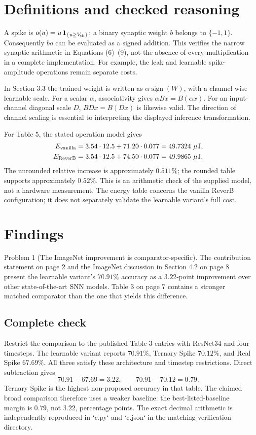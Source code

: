 \documentclass[10pt]{article}
\begin{document}
\section*{Definitions and checked reasoning}
A spike is \(o(u)=u\,\mathbf 1_{\{u\geq V_{\rm th}\}}\); a binary synaptic weight \(b\) belongs to \(\{-1,1\}\). Consequently \(bo\) can be evaluated as a signed addition. This verifies the narrow synaptic arithmetic in Equations (6)–(9), not the absence of every multiplication in a complete implementation. For example, the leak and learnable spike-amplitude operations remain separate costs.\par
In Section 3.3 the trained weight is written as \(\alpha\operatorname{sign}(W)\), with a channel-wise learnable scale. For a scalar \(\alpha\), associativity gives \(\alpha Bx=B(\alpha x)\). For an input-channel diagonal scale \(D\), \(BDx=B(Dx)\) is likewise valid. The direction of channel scaling is essential to interpreting the displayed inference transformation.\par
For Table 5, the stated operation model gives \[\begin{aligned}
 E_{\rm vanilla}
 &=3.54\cdot12.5+71.20\cdot0.077
   =49.7324\ \mu{\rm J},\\
 E_{\rm ReverB}
 &=3.54\cdot12.5+74.50\cdot0.077
   =49.9865\ \mu{\rm J}.\end{aligned}\] The unrounded relative increase is approximately \(0.511\%\); the rounded table supports approximately \(0.52\%\). This is an arithmetic check of the supplied model, not a hardware measurement. The energy table concerns the vanilla ReverB configuration; it does not separately validate the learnable variant’s full cost.\par
\section*{Findings}
Problem 1 (The ImageNet improvement is comparator-specific).  The contribution statement on page 2 and the ImageNet discussion in Section 4.2 on page 8 present the learnable variant’s \(70.91\%\) accuracy as a \(3.22\)-point improvement over other state-of-the-art SNN models. Table 3 on page 7 contains a stronger matched comparator than the one that yields this difference.\par
\subsection*{Complete check}
Restrict the comparison to the published Table 3 entries with ResNet34 and four timesteps. The learnable variant reports \(70.91\%\), Ternary Spike \(70.12\%\), and Real Spike \(67.69\%\). All three satisfy these architecture and timestep restrictions. Direct subtraction gives \[70.91-67.69=3.22,\qquad 70.91-70.12=0.79.\] Ternary Spike is the highest non-proposed accuracy in that table. The claimed broad comparison therefore uses a weaker baseline: the best-listed-baseline margin is \(0.79\), not \(3.22\), percentage points. The exact decimal arithmetic is independently reproduced in `c.py` and `c.json` in the matching verification directory.\par
\end{document}

